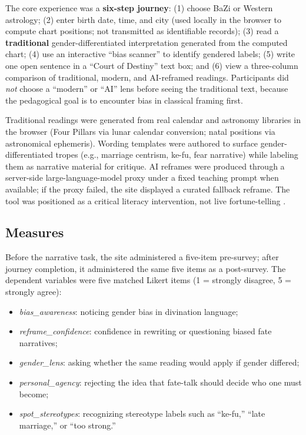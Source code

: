 \documentclass[stu,12pt,floatsintext]{apa7}
\begin{document}
The core experience was a \textbf{six-step journey}: (1) choose BaZi or Western astrology; (2) enter birth date, time, and city (used locally in the browser to compute chart positions; not transmitted as identifiable records); (3) read a \textbf{traditional} gender-differentiated interpretation generated from the computed chart; (4) use an interactive ``bias scanner'' to identify gendered labels; (5) write one open sentence in a ``Court of Destiny'' text box; and (6) view a three-column comparison of traditional, modern, and AI-reframed readings. Participants did \emph{not} choose a ``modern'' or ``AI'' lens before seeing the traditional text, because the pedagogical goal is to encounter bias in classical framing first.

Traditional readings were generated from real calendar and astronomy libraries in the browser (Four Pillars via lunar calendar conversion; natal positions via astronomical ephemeris). Wording templates were authored to surface gender-differentiated tropes (e.g., marriage centrism, ke-fu, fear narrative) while labeling them as narrative material for critique. AI reframes were produced through a server-side large-language-model proxy under a fixed teaching prompt when available; if the proxy failed, the site displayed a curated fallback reframe. The tool was positioned as a critical literacy intervention, not live fortune-telling \parencite{bender2021}.

\subsection{Measures}

Before the narrative task, the site administered a five-item pre-survey; after journey completion, it administered the same five items as a post-survey. The dependent variables were five matched Likert items (1 = strongly disagree, 5 = strongly agree):

\begin{itemize}
  \item \textit{bias\_awareness}: noticing gender bias in divination language;
  \item \textit{reframe\_confidence}: confidence in rewriting or questioning biased fate narratives;
  \item \textit{gender\_lens}: asking whether the same reading would apply if gender differed;
  \item \textit{personal\_agency}: rejecting the idea that fate-talk should decide who one must become;
  \item \textit{spot\_stereotypes}: recognizing stereotype labels such as ``ke-fu,'' ``late marriage,'' or ``too strong.''
\end{itemize}
\end{document}
